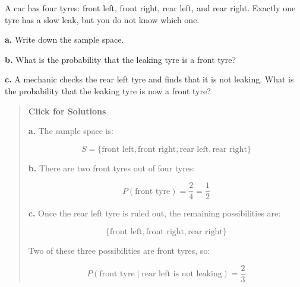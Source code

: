 \documentclass[
  letterpaper,
  DIV=11,
  numbers=noendperiod]{scrreprt}
\begin{document}
\begin{tcolorbox}[enhanced jigsaw, arc=.35mm, bottomrule=.15mm, bottomtitle=1mm, breakable, colback=white, colbacktitle=quarto-callout-note-color!10!white, colframe=quarto-callout-note-color-frame, coltitle=black, left=2mm, leftrule=.75mm, opacityback=0, opacitybacktitle=0.6, rightrule=.15mm, title=\textcolor{quarto-callout-note-color}{\faInfo}\hspace{0.5em}{Question 4}, titlerule=0mm, toprule=.15mm, toptitle=1mm]

A car has four tyres: front left, front right, rear left, and rear
right. Exactly one tyre has a slow leak, but you do not know which one.

\textbf{a.} Write down the sample space.

\textbf{b.} What is the probability that the leaking tyre is a front
tyre?

\textbf{c.} A mechanic checks the rear left tyre and finds that it is
not leaking. What is the probability that the leaking tyre is now a
front tyre?

\begin{quote}
\textbf{Click for Solutions}

\textbf{a.} The sample space is:

\[
S = \{\text{front left},\text{front right},\text{rear left},\text{rear right}\}
\]

\textbf{b.} There are two front tyres out of four tyres:

\[
P(\text{front tyre}) = \frac{2}{4} = \frac{1}{2}
\]

\textbf{c.} Once the rear left tyre is ruled out, the remaining
possibilities are:

\[
\{\text{front left},\text{front right},\text{rear right}\}
\]

Two of these three possibilities are front tyres, so:

\[
P(\text{front tyre} \mid \text{rear left is not leaking}) = \frac{2}{3}
\]
\end{quote}

\end{tcolorbox}
\end{document}
